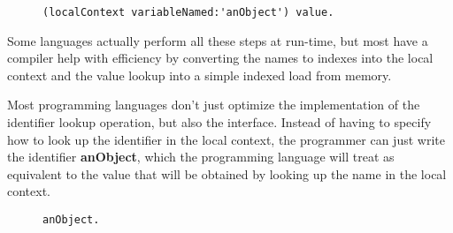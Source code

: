 \documentclass[preprint,authoryear]{acm_proc_article-sp}
\begin{document}

\begin{figure}[htbp]
\begin{lstlisting}[style=L,label=variable-lookup,caption=Lookup of a local variable.]
  (localContext variableNamed:'anObject') value.
\end{lstlisting}
\end{figure}

Some  languages actually perform all these steps at run-time, but most 
have a compiler help with efficiency by converting the names to indexes into
the local context and the value lookup into a simple indexed load from memory.

Most programming languages don't just optimize the implementation of the identifier
lookup operation, but also the interface.  Instead of having to specify how to
look up the identifier in the local context, the programmer can just write the
identifier {\bf anObject}, which the programming language will treat as equivalent to the
value that will be obtained by looking up the name in the local context.  


\begin{figure}[htbp]
\begin{lstlisting}[style=L,label=plain-identifier,caption=Identifier-oblivious variable lookup.]
  anObject.
\end{lstlisting}
\end{figure}
\end{document}

